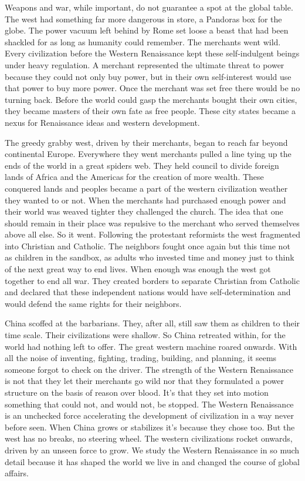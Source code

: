 \documentclass[a4paper, 12pt]{article}
\begin{document}
Weapons and war, while important, do not guarantee a spot at the global table. The west had something far more dangerous in store, a Pandoras box for the globe. The power vacuum left behind by Rome set loose a beast that had been shackled for as long as humanity could remember. The merchants went wild. Every civilization before the Western Renaissance kept these self-indulgent beings under heavy regulation. A merchant represented the ultimate threat to power because they could not only buy power, but in their own self-interest would use that power to buy more power. Once the merchant was set free there would be no turning back. Before the world could gasp the merchants bought their own cities, they became masters of their own fate as free people. These city states became a nexus for Renaissance ideas and western development.

The greedy grabby west, driven by their merchants, began to reach far beyond continental Europe. Everywhere they went merchants pulled a line tying up the ends of the world in a great spiders web. They held council to divide foreign lands of Africa and the Americas for the creation of more wealth. These conquered lands and peoples became a part of the western civilization weather they wanted to or not. When the merchants had purchased enough power and their world was weaved tighter they challenged the church. The idea that one should remain in their place was repulsive to the merchant who served themselves above all else. So it went. Following the protestant reformists the west fragmented into Christian and Catholic. The neighbors fought once again but this time not as children in the sandbox, as adults who invested time and money just to think of the next great way to end lives. When enough was enough the west got together to end all war. They created borders to separate Christian from Catholic and declared that these independent nations would have self-determination and would defend the same rights for their neighbors.

China scoffed at the barbarians. They, after all, still saw them as children to their time scale. Their civilizations were shallow. So China retreated within, for the world had nothing left to offer. The great western machine roared onwards. With all the noise of inventing, fighting, trading, building, and planning, it seems someone forgot to check on the driver. The strength of the Western Renaissance is not that they let their merchants go wild nor that they formulated a power structure on the basis of reason over blood. It's that they set into motion something that could not, and would not, be stopped. The Western Renaissance is an unchecked force accelerating the development of civilization in a way never before seen. When China grows or stabilizes it's because they chose too. But the west has no breaks, no steering wheel. The western civilizations rocket onwards, driven by an unseen force to grow. We study the Western Renaissance in so much detail because it has shaped the world we live in and changed the course of global affairs.
\end{document}

